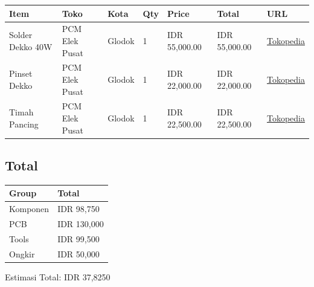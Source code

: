 \documentclass[a4paper,12pt,oneside,pdflatex,italian,final,twocolumn]{article}
\begin{document}
	\begin{table}[!ht]
		\centering
		\begin{tabular}{|l|l|l|l|l|l|l|}
			\hline
			Item & Toko & Kota & Qty & Price & Total & URL \\ \hline
			Solder Dekko 40W & PCM Elek Pusat & Glodok & 1 & IDR 55,000.00 & IDR 55,000.00 & \href{https://www.tokopedia.com/pcmelektronik/soldering-solder-iron-dekko-deko-40w-40-watr}{Tokopedia} \\ \hline
			Pinset Dekko & PCM Elek Pusat & Glodok & 1 & IDR 22,000.00 & IDR 22,000.00 & \href{https://www.tokopedia.com/pcmelektronik/pinset-dekko-tekuk-bagus-ori}{Tokopedia} \\ \hline
			Timah Pancing & PCM Elek Pusat & Glodok & 1 & IDR 22,500.00 & IDR 22,500.00 & \href{https://www.tokopedia.com/pcmelektronik/timah-solder-1-rol-10-meter-merk-pancing}{Tokopedia} \\ \hline
		\end{tabular}
	\end{table}
	
	\subsection{Total}
	
	\begin{table}[!ht]
		\centering
		\begin{tabular}{|l|l|}
			\hline
			Group & Total \\ \hline
			Komponen & IDR 98,750 \\ \hline
			PCB & IDR 130,000 \\ \hline
			Tools & IDR 99,500 \\ \hline
			Ongkir & IDR 50,000 \\ \hline
		\end{tabular}
	\end{table}
	
	Estimasi Total: IDR 37,8250
	
\end{document}

